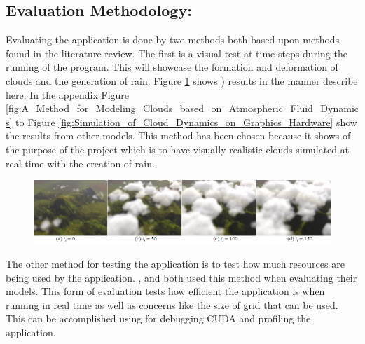 \subsection{Evaluation Methodology:}
Evaluating the application is done by two methods both based upon methods found in the literature review.
The first is a visual test at time steps during the running of the program.
This will showcase the formation and deformation of clouds and the generation of rain.
Figure \ref{fig:Simple Realistic Animation of Clouds} shows \citet{DobashiEtAl00}) results in the manner describe here.
In the appendix Figure \ref{fig:A_Method_for_Modeling_Clouds_based_on_Atmospheric_Fluid_Dynamics} to Figure \ref{fig:Simulation_of_Cloud_Dynamics_on_Graphics_Hardware} show the results from other models.
This method has been chosen because it shows of the purpose of the project which is to have visually realistic clouds simulated at real time with the creation of rain.

\begin{figure}[h!]
  \centering
  \includegraphics[width=140mm]{images/Simple_Realistic_Animation_of_Clouds.PNG}
  \caption{\citet{DobashiEtAl00}}
  \label{fig:Simple Realistic Animation of Clouds}
\end{figure}

The other method for testing the application is to test how much resources are being used by the application.
\citet*{MHarris01}, and \citet{Elek12} both used this method when evaluating their models.
This form of evaluation tests how efficient the application is when running in real time as well as concerns like the size of grid that can be used.
This can be accomplished using \citet*{nvidiasight2013} for debugging CUDA and profiling the application.